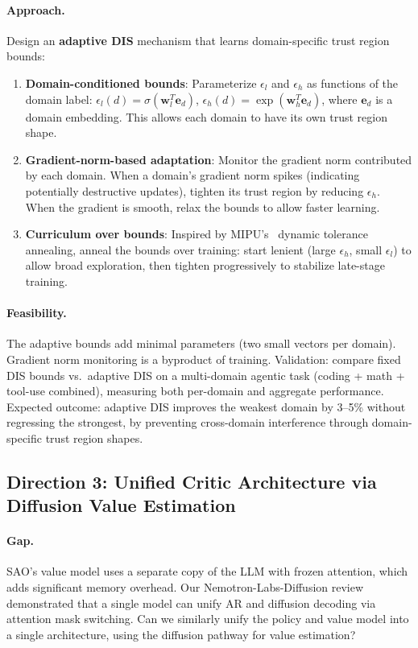 \documentclass[11pt,a4paper]{article}
\begin{document}
\paragraph{Approach.} Design an \textbf{adaptive DIS} mechanism that learns domain-specific trust region bounds:
\begin{enumerate}
\item \textbf{Domain-conditioned bounds}: Parameterize $\epsilon_l$ and $\epsilon_h$ as functions of the domain label: $\epsilon_l(d) = \sigma(\mathbf{w}_l^T \mathbf{e}_d)$, $\epsilon_h(d) = \exp(\mathbf{w}_h^T \mathbf{e}_d)$, where $\mathbf{e}_d$ is a domain embedding. This allows each domain to have its own trust region shape.
\item \textbf{Gradient-norm-based adaptation}: Monitor the gradient norm contributed by each domain. When a domain's gradient norm spikes (indicating potentially destructive updates), tighten its trust region by reducing $\epsilon_h$. When the gradient is smooth, relax the bounds to allow faster learning.
\item \textbf{Curriculum over bounds}: Inspired by MIPU's~\cite{mirage2026} dynamic tolerance annealing, anneal the bounds over training: start lenient (large $\epsilon_h$, small $\epsilon_l$) to allow broad exploration, then tighten progressively to stabilize late-stage training.
\end{enumerate}

\paragraph{Feasibility.} The adaptive bounds add minimal parameters (two small vectors per domain). Gradient norm monitoring is a byproduct of training. Validation: compare fixed DIS bounds vs.\ adaptive DIS on a multi-domain agentic task (coding + math + tool-use combined), measuring both per-domain and aggregate performance. Expected outcome: adaptive DIS improves the weakest domain by 3--5\% without regressing the strongest, by preventing cross-domain interference through domain-specific trust region shapes.

\subsection{Direction 3: Unified Critic Architecture via Diffusion Value Estimation}

\paragraph{Gap.} SAO's value model uses a separate copy of the LLM with frozen attention, which adds significant memory overhead. Our Nemotron-Labs-Diffusion review~\cite{nemotron2026} demonstrated that a single model can unify AR and diffusion decoding via attention mask switching. Can we similarly unify the policy and value model into a single architecture, using the diffusion pathway for value estimation?
\end{document}
